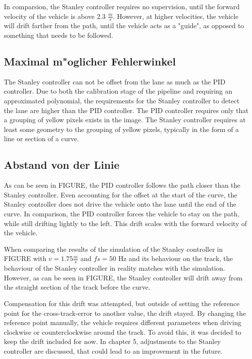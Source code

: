 \documentclass[arbeit=studie,oneside,BCOR=12mm]{ArbeitRST}
\begin{document}
In comparsion, the Stanley controller requires no supervision, until the
forward velocity of the vehicle is above 2.3 $\frac{m}{s}$. However, at higher
velocities, the vehicle will drift farther from the path, until the vehicle
acts as a "guide", as opposed to something that needs to be followed. 
\fi

\subsection{Maximal m"oglicher Fehlerwinkel}

The Stanley controller can not be offset from the lane as much as the PID
controller. Due to both the calibration stage of the pipeline and requiring an
approximated polynomial, the requirements for the Stanley controller to detect
the lane are higher than the PID controller. The PID controller requires only
that a grouping of yellow pixels exists in the image. The Stanley controller
requires at least some geometry to the grouping of yellow pixels, typically in
the form of a line or section of a curve.

\subsection{Abstand von der Linie}

As can be seen in FIGURE, the PID controller follows the path closer than the
Stanley controller. Even accounting for the offset at the start of the curve,
the Stanley controller does not drive the vehicle onto the lane until the end
of the curve. In comparison, the PID controller forces the vehicle to stay on
the path, while still drifting lightly to the left. This drift scales with the
forward velocity of the vehicle.

When comparing the results of the simulation of the Stanley controller in
FIGURE with $v = 1.75 \frac{m}{s}$ and $fs = 50$ Hz and its behaviour on the
track, the behaviour of the Stanley controller in reality matches with the
simulation. However, as can be seen in FIGURE, the Stanley controller will
drift away from the straight section of the track before the curve. 

Compensation for this drift was attempted, but outside of setting the reference
point for the cross-track-error to another value, the drift stayed. By changing
the reference point manually, the vehicle requires different parameters when
driving clockwise or counterclockwise around the track. To avoid this, it was
decided to keep the drift included for now. In chapter 5, adjustments to the
Stanley controller are discussed, that could lead to an improvement in the
future.
\end{document}
